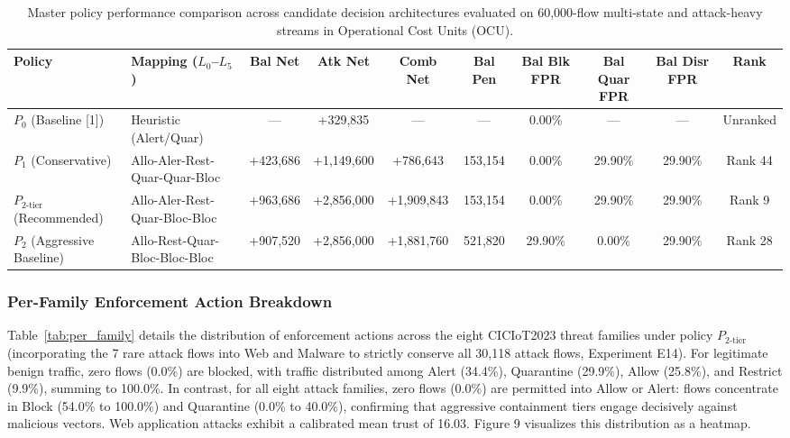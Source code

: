 \documentclass[journal,10pt,onecolumn]{IEEEtran}
\begin{document}
\begin{table}[t]
\caption{Master policy performance comparison across candidate decision architectures evaluated on 60,000-flow multi-state and attack-heavy streams in Operational Cost Units (OCU).}
\label{tab:master_policy}
\centering
\footnotesize
\begin{tabular}{llcccccccc}
\toprule
\textbf{Policy} & \textbf{Mapping ($L_0$--$L_5$)} & \textbf{Bal Net} & \textbf{Atk Net} & \textbf{Comb Net} & \textbf{Bal Pen} & \textbf{Bal Blk FPR} & \textbf{Bal Quar FPR} & \textbf{Bal Disr FPR} & \textbf{Rank} \\
\midrule
$P_0$ (Baseline [1]) & Heuristic (Alert/Quar) & --- & +329,835 & --- & --- & 0.00\% & --- & --- & Unranked \\
$P_1$ (Conservative) & Allo-Aler-Rest-Quar-Quar-Bloc & +423,686 & +1,149,600 & +786,643 & 153,154 & 0.00\% & 29.90\% & 29.90\% & Rank 44 \\
$P_{2\text{-tier}}$ (Recommended) & Allo-Aler-Rest-Quar-Bloc-Bloc & +963,686 & +2,856,000 & +1,909,843 & 153,154 & 0.00\% & 29.90\% & 29.90\% & Rank 9 \\
$P_2$ (Aggressive Baseline) & Allo-Rest-Quar-Bloc-Bloc-Bloc & +907,520 & +2,856,000 & +1,881,760 & 521,820 & 29.90\% & 0.00\% & 29.90\% & Rank 28 \\
\bottomrule
\end{tabular}
\end{table}

\subsubsection{Per-Family Enforcement Action Breakdown}
Table~\ref{tab:per_family} details the distribution of enforcement actions across the eight CICIoT2023 threat families under policy $P_{2\text{-tier}}$ (incorporating the 7 rare attack flows into Web and Malware to strictly conserve all 30,118 attack flows, Experiment E14). For legitimate benign traffic, zero flows (0.0\%) are blocked, with traffic distributed among Alert (34.4\%), Quarantine (29.9\%), Allow (25.8\%), and Restrict (9.9\%), summing to 100.0\%. In contrast, for all eight attack families, zero flows (0.0\%) are permitted into Allow or Alert: flows concentrate in Block (54.0\% to 100.0\%) and Quarantine (0.0\% to 40.0\%), confirming that aggressive containment tiers engage decisively against malicious vectors. Web application attacks exhibit a calibrated mean trust of 16.03. Figure 9 visualizes this distribution as a heatmap.
\end{document}
